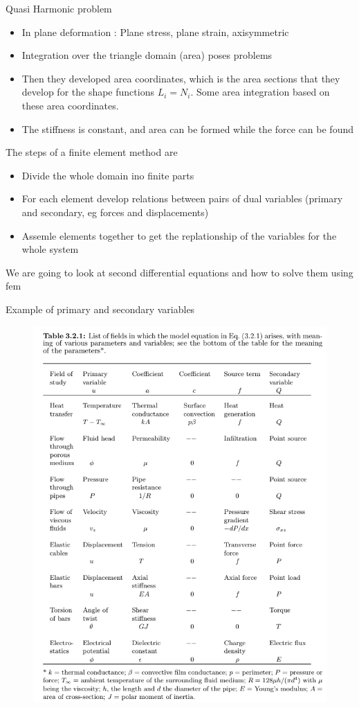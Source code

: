 	\begin{frame}{Quasi Harmonic problem}
		\begin{itemize}
			\item In plane deformation : Plane stress, plane strain, axisymmetric
			\item Integration over the triangle domain (area) poses problems
			\item Then they developed area coordinates, which is the area sections that they develop for the shape functions $L_i = N_i$. Some area integration based on these area coordinates.
			\item The stiffness is constant, and area can be formed while the force can be found
			
		\end{itemize}
	\end{frame}
 


	\begin{frame}
		The steps of a finite element method are
		\begin{itemize}
			\item Divide the whole domain ino finite parts
			\item For each element develop relations between pairs of dual variables (primary and secondary, eg forces and displacements)
			\item Assemle elements together to get the replationship of the variables for the whole system	
		\end{itemize}
		We are going to look at second differential equations and how to solve them using fem
	\end{frame}


	\begin{frame}{Example of primary and secondary variables}
		\begin{figure}
			\centering
			\includegraphics[width=0.5\linewidth]{Figure/fig2} 
		\end{figure}
	\end{frame}


